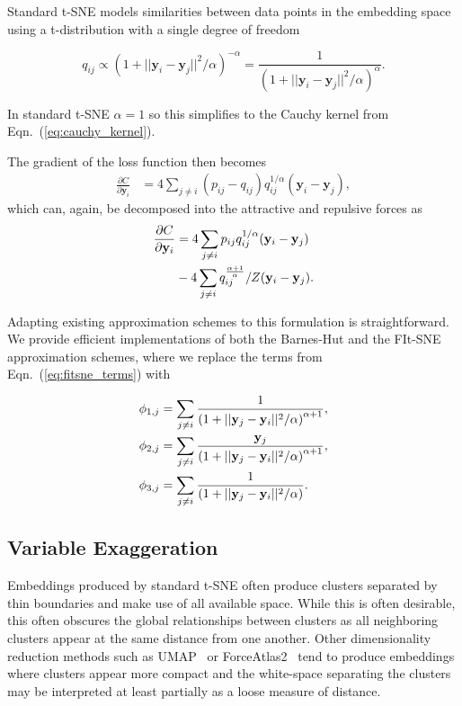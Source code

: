 \documentclass[twocolumn]{bmcart}
\begin{document}
Standard t-SNE models similarities between data points in the embedding space
using a t-distribution with a single degree of freedom

\begin{equation}
q_{ij} \propto \left ( 1 + || \mathbf{y}_i - \mathbf{y}_j ||^2 / \alpha \right )^{-\alpha} = \frac{1}{\left( 1 + || \mathbf{y}_i - \mathbf{y}_j ||^2 / \alpha \right)^\alpha }.
\end{equation}

In standard t-SNE $\alpha=1$ so this simplifies to the Cauchy kernel from
Eqn.~(\ref{eq:cauchy_kernel}).

The gradient of the loss function then becomes
\begin{align}
\frac{\partial C}{\partial \mathbf{y}_i} &= 4 \sum_{j \neq i} \left ( p_{ij} - q_{ij} \right ) q_{ij}^{1/\alpha} \left ( \mathbf{y}_i - \mathbf{y}_j \right ),
\end{align}
which can, again, be decomposed into the attractive and repulsive forces as
\begin{align}
\frac{\partial C}{\partial \mathbf{y}_i} &= 4 \sum_{j \neq i} p_{ij} q_{ij}^{1/\alpha} (\mathbf{y}_i - \mathbf{y}_j) \notag \\
&- 4 \sum_{j \neq i} q_{ij}^{\frac{\alpha+1}{\alpha}} / Z (\mathbf{y}_i - \mathbf{y}_j).
\end{align}

Adapting existing approximation schemes to this formulation is straightforward.
We provide efficient implementations of both the Barnes-Hut and the FIt-SNE
approximation schemes, where we replace the terms from
Eqn.~(\ref{eq:fitsne_terms}) with

\begin{align}
\phi_{1,j} &= \sum_{j \neq i} \frac{1}{\left( 1 + || \mathbf{y}_j - \mathbf{y}_i ||^2 / \alpha \right)^{\alpha+1}}, \notag \\
\phi_{2,j} &= \sum_{j \neq i} \frac{\mathbf{y}_j}{\left( 1 + || \mathbf{y}_j - \mathbf{y}_i ||^2 / \alpha \right)^{\alpha+1}}, \notag \\
\phi_{3,j} &= \sum_{j \neq i} \frac{1}{\left( 1 + || \mathbf{y}_j - \mathbf{y}_i ||^2 / \alpha \right)}. \notag
\end{align}

\subsection*{Variable Exaggeration}

Embeddings produced by standard t-SNE often produce clusters separated by thin
boundaries and make use of all available space. While this is often desirable,
this often obscures the global relationships between clusters as all
neighboring clusters appear at the same distance from one another. Other
dimensionality reduction methods such as UMAP~\cite{2018arXivUMAP} or
ForceAtlas2~\cite{jacomy2014forceatlas2} tend to produce embeddings where
clusters appear more compact and the white-space separating the clusters may be
interpreted at least partially as a loose measure of distance.
\end{document}
